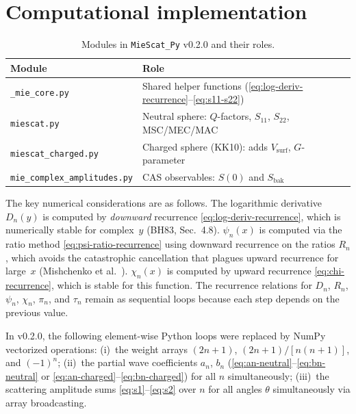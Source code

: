 \documentclass[a4paper,11pt]{article}
\begin{document}
\section{Computational implementation}
\label{sec:implementation}

\begin{table}[htbp]
  \caption{Modules in \texttt{MieScat\_Py} v0.2.0 and their roles.}
  \label{tab:modules}
  \centering
  \begin{tabular}{@{}ll@{}}
    \toprule
    Module & Role \\
    \midrule
    \texttt{\_mie\_core.py}            & Shared helper functions
      (\eqref{eq:log-deriv-recurrence}--\eqref{eq:s11-s22}) \\
    \texttt{miescat.py}                & Neutral sphere:
      $Q$-factors, $S_{11}$, $S_{22}$, MSC/MEC/MAC \\
    \texttt{miescat\_charged.py}       & Charged sphere (KK10):
      adds $V_\mathrm{surf}$, $G$-parameter \\
    \texttt{mie\_complex\_amplitudes.py} & CAS observables:
      $S(0)$ and $S_\mathrm{bak}$ \\
    \bottomrule
  \end{tabular}
\end{table}

The key numerical considerations are as follows.
The logarithmic derivative $D_n(y)$ is computed by \emph{downward} recurrence
\eqref{eq:log-deriv-recurrence}, which is numerically stable for complex~$y$
(BH83, Sec.~4.8).
$\psi_n(x)$ is computed via the ratio method
\eqref{eq:psi-ratio-recurrence} using downward recurrence on the ratios $R_n$,
which avoids the catastrophic cancellation that plagues upward recurrence for
large~$x$ (Mishchenko et al.\ \cite{mishchenko2002}).
$\chi_n(x)$ is computed by upward recurrence \eqref{eq:chi-recurrence}, which
is stable for this function.
The recurrence relations for $D_n$, $R_n$, $\psi_n$, $\chi_n$, $\pi_n$,
and $\tau_n$ remain as sequential loops because each step depends on the
previous value.

In v0.2.0, the following element-wise Python loops were replaced by NumPy
vectorized operations:
(i)~the weight arrays $(2n+1)$, $(2n+1)/[n(n+1)]$, and $(-1)^n$;
(ii)~the partial wave coefficients $a_n$, $b_n$
(\eqref{eq:an-neutral}--\eqref{eq:bn-neutral} or
 \eqref{eq:an-charged}--\eqref{eq:bn-charged}) for all $n$ simultaneously;
(iii)~the scattering amplitude sums \eqref{eq:s1}--\eqref{eq:s2} over $n$
for all angles $\theta$ simultaneously via array broadcasting.
\end{document}
